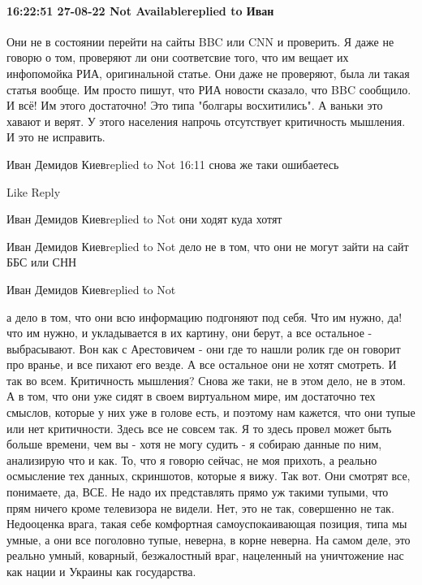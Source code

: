  
 
 
 
 

\paragraph{16:22:51 27-08-22 Not Availablereplied to Иван}

Они не в состоянии перейти на сайты BBC или CNN и проверить. Я даже не говорю о
том, проверяют ли они соответсвие того, что им вещает их инфопомойка РИА,
оригинальной статье. Они даже не проверяют, была ли такая статья вообще. Им
просто пишут, что РИА новости сказало, что BBC сообщило. И всё! Им этого
достаточно! Это типа "болгары восхитились". А ваньки это хавают и верят. У
этого населения напрочь отсутствует критичность мышления. И это не исправить.


Иван Демидов Киевreplied to Not
16:11
снова же таки ошибаетесь

    Like
    Reply

Иван Демидов Киевreplied to Not
они ходят куда хотят

Иван Демидов Киевreplied to Not
дело не в том, что они не могут зайти на сайт ББС или СНН

Иван Демидов Киевreplied to Not

а дело в том, что они всю информацию подгоняют под себя. Что им нужно, да! что
им нужно, и укладывается в их картину, они берут, а все остальное -
выбрасывают. Вон как с Арестовичем - они где то нашли ролик где он говорит про
вранье, и все пихают его везде. А все остальное они не хотят смотреть. И так во
всем. Критичность мышления? Снова же таки, не в этом дело, не в этом. А в том,
что они уже сидят в своем виртуальном мире, им достаточно тех смыслов, которые
у них уже в голове есть, и поэтому нам кажется, что они тупые или нет
критичности. Здесь все не совсем так. Я то здесь провел может быть больше
времени, чем вы - хотя не могу судить - я собираю данные по ним, анализирую что
и как. То, что я говорю сейчас, не моя прихоть, а реально осмысление тех
данных, скриншотов, которые я вижу. Так вот. Они смотрят все, понимаете, да,
ВСЕ. Не надо их представлять прямо уж такими тупыми, что прям ничего кроме
телевизора не видели. Нет, это не так, совершенно не так. Недооценка врага,
такая себе комфортная самоуспокаивающая позиция, типа мы умные, а они все
поголовно тупые, неверна, в корне неверна. На самом деле, это реально умный,
коварный, безжалостный враг, нацеленный на уничтожение нас как нации и Украины
как государства.

